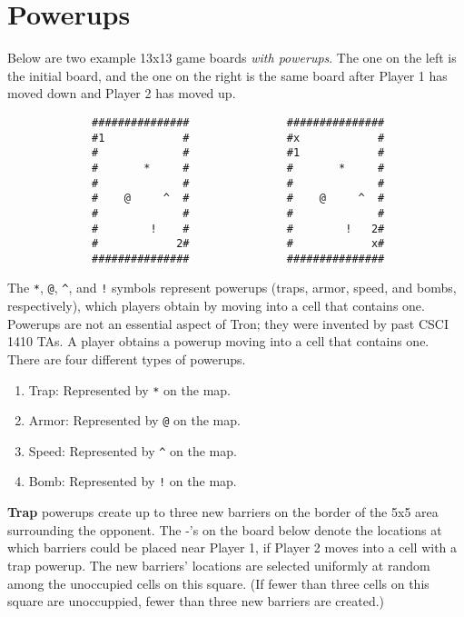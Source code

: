 \documentclass{article}
\begin{document}




\appendix

\section{Powerups}
\label{app:powerups}
Below are two example 13x13 game boards \emph{with powerups}.  The one
on the left is the initial board, and the one on the right is the same
board after Player 1 has moved down and Player 2 has moved up.

\begin{verbatim}
             ###############               ###############
             #1            #               #x            #
             #             #               #1            #
             #       *     #               #       *     #
             #             #               #             #
             #    @     ^  #               #    @     ^  #
             #             #               #             #
             #        !    #               #        !   2#
             #            2#               #            x#
             ###############               ###############
\end{verbatim}

The \verb|*|, \verb|@|, \verb|^|, and \verb|!| symbols represent
powerups (traps, armor, speed, and bombs, respectively), which
players obtain by moving into a cell that contains one.
Powerups are not an essential aspect of Tron;
they were invented by past CSCI 1410 TAs.
%
A player obtains a powerup moving into a cell that contains one.
There are four different types of powerups.

\begin{enumerate}
\item Trap: Represented by \texttt{*} on the map.

\item Armor: Represented by \texttt{@} on the map.

\item Speed: Represented by \texttt{\^} on the map.

\item Bomb: Represented by \texttt{!} on the map.
\end{enumerate}
\fi

\textbf{Trap} powerups create up to three new barriers on the border
of the 5x5 area surrounding the opponent.  The -'s on the board below
denote the locations at which barriers could be placed near Player 1,
if Player 2 moves into a cell with a trap powerup.  The new barriers'
locations are selected uniformly at random among the unoccupied cells
on this square.  (If fewer than three cells on this square are
unoccuppied, fewer than three new barriers are created.)
\end{document}
